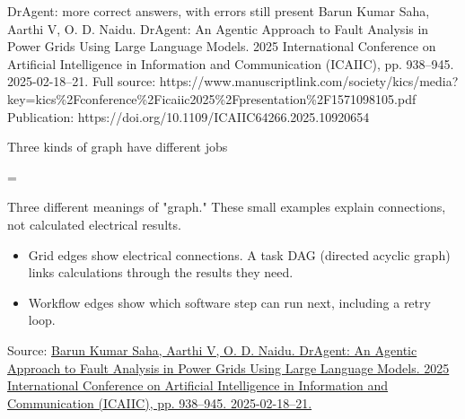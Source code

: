 \begin{frame}[t]{DrAgent: more correct answers, with errors still present}
{Barun Kumar Saha, Aarthi V, O. D. Naidu. DrAgent: An Agentic Approach to Fault Analysis in Power Grids Using Large Language Models. 2025 International Conference on Artificial Intelligence in Information and Communication (ICAIIC), pp. 938--945. 2025-02-18--21.
Full source: https://www.manuscriptlink.com/society/kics/media?key=kics\%2Fconference\%2Ficaiic2025\%2Fpresentation\%2F1571098105.pdf
Publication: https://doi.org/10.1109/ICAIIC64266.2025.10920654}
\end{frame}

\begin{frame}[t]{Three kinds of graph have different jobs}
\relax
\begingroup\begin{minipage}[c][3.8cm][c]{\linewidth}\centering{}=\hbox{\resizebox{.96\linewidth}{!}{}}\ifdim\dimexpr\ht0+\dp0\relax>3.8cm\resizebox{!}{3.8cm}{\box0}\else\box0\fi\par\end{minipage}
{\fontsize{7}{8.3}\selectfont\color{Slate} Three different meanings of "graph." These small examples explain connections, not calculated electrical results.\par}
\endgroup\smallskip
{
\small\begin{itemize}
\setlength{\itemsep}{.25em}
\item Grid edges show electrical connections. A task DAG (directed acyclic graph) links calculations through the results they need.
\item Workflow edges show which software step can run next, including a retry loop.
\end{itemize}\par}
\vfill
{\fontsize{6.3}{7.5}\selectfont\color{Slate} Source: \href{https://www.manuscriptlink.com/society/kics/media?key=kics\%2Fconference\%2Ficaiic2025\%2Fpresentation\%2F1571098105.pdf}{Barun Kumar Saha, Aarthi V, O. D. Naidu. DrAgent: An Agentic Approach to Fault Analysis in Power Grids Using Large Language Models. 2025 International Conference on Artificial Intelligence in Information and Communication (ICAIIC), pp. 938--945. 2025-02-18--21.}\par}
\end{frame}
